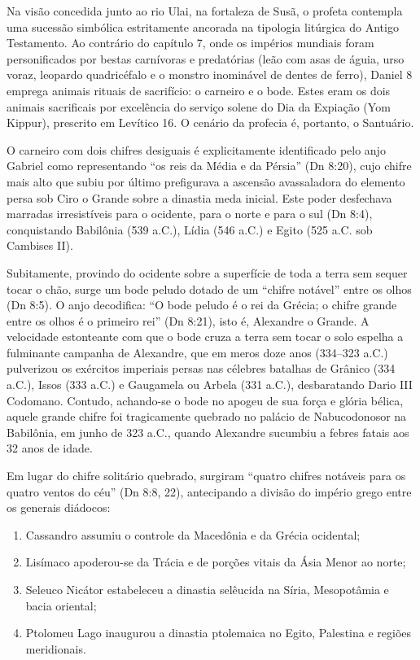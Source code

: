 \documentclass[11pt,a4paper,openany]{book}
\begin{document}
Na visão concedida junto ao rio Ulai, na fortaleza de Susã, o profeta contempla uma sucessão simbólica estritamente ancorada na tipologia litúrgica do Antigo Testamento. Ao contrário do capítulo 7, onde os impérios mundiais foram personificados por bestas carnívoras e predatórias (leão com asas de águia, urso voraz, leopardo quadricéfalo e o monstro inominável de dentes de ferro), Daniel 8 emprega animais rituais de sacrifício: o carneiro e o bode. Estes eram os dois animais sacrificais por excelência do serviço solene do Dia da Expiação (Yom Kippur), prescrito em Levítico 16. O cenário da profecia é, portanto, o Santuário.

O carneiro com dois chifres desiguais é explicitamente identificado pelo anjo Gabriel como representando ``os reis da Média e da Pérsia'' (Dn 8:20), cujo chifre mais alto que subiu por último prefigurava a ascensão avassaladora do elemento persa sob Ciro o Grande sobre a dinastia meda inicial. Este poder desfechava marradas irresistíveis para o ocidente, para o norte e para o sul (Dn 8:4), conquistando Babilônia (539 a.C.), Lídia (546 a.C.) e Egito (525 a.C. sob Cambises II).

Subitamente, provindo do ocidente sobre a superfície de toda a terra sem sequer tocar o chão, surge um bode peludo dotado de um ``chifre notável'' entre os olhos (Dn 8:5). O anjo decodifica: ``O bode peludo é o rei da Grécia; o chifre grande entre os olhos é o primeiro rei'' (Dn 8:21), isto é, Alexandre o Grande. A velocidade estonteante com que o bode cruza a terra sem tocar o solo espelha a fulminante campanha de Alexandre, que em meros doze anos (334–323 a.C.) pulverizou os exércitos imperiais persas nas célebres batalhas de Grânico (334 a.C.), Issos (333 a.C.) e Gaugamela ou Arbela (331 a.C.), desbaratando Dario III Codomano. Contudo, achando-se o bode no apogeu de sua força e glória bélica, aquele grande chifre foi tragicamente quebrado no palácio de Nabucodonosor na Babilônia, em junho de 323 a.C., quando Alexandre sucumbiu a febres fatais aos 32 anos de idade.

Em lugar do chifre solitário quebrado, surgiram ``quatro chifres notáveis para os quatro ventos do céu'' (Dn 8:8, 22), antecipando a divisão do império grego entre os generais diádocos:
\begin{enumerate}
  \item Cassandro assumiu o controle da Macedônia e da Grécia ocidental;
  \item Lisímaco apoderou-se da Trácia e de porções vitais da Ásia Menor ao norte;
  \item Seleuco Nicátor estabeleceu a dinastia selêucida na Síria, Mesopotâmia e bacia oriental;
  \item Ptolomeu Lago inaugurou a dinastia ptolemaica no Egito, Palestina e regiões meridionais.
\end{enumerate}
\end{document}
